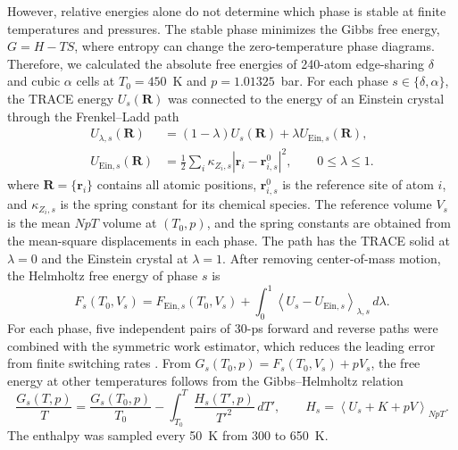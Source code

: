 \documentclass[aps,prx,preprint,notitlepage,superscriptaddress,nofootinbib,floatfix]{revtex4-2}
\newif\ifshowrevisions
\newcommand{\drafttwentysix}[1]{%
  \ifshowrevisions\textcolor{drafttwentysixcolor}{#1}\else#1\fi}
\newcommand{\drafttwentysixeq}[1]{%
  \ifshowrevisions{\color{drafttwentysixcolor}#1}\else#1\fi}
\begin{document}
However, relative energies alone do not determine which phase is stable at finite temperatures and pressures. The stable phase minimizes the Gibbs free energy, $G=H-TS$, where entropy can change the zero-temperature phase diagrams. Therefore, we calculated the absolute free energies of 240-atom edge-sharing $\delta$ and cubic $\alpha$ cells at $T_0=450$~K and $p=1.01325$~bar. For each phase $s\in\{\delta,\alpha\}$, the TRACE energy $U_s(\mathbf R)$ was connected to the energy of an Einstein crystal through the Frenkel--Ladd path
\cite{frenkel1984}
\begin{equation}
\drafttwentysixeq{
\begin{aligned}
 U_{\lambda,s}(\mathbf R)
 &= (1-\lambda)U_s(\mathbf R)
    +\lambda U_{\mathrm{Ein},s}(\mathbf R),\\
 U_{\mathrm{Ein},s}(\mathbf R)
 &= \frac{1}{2}\sum_i \kappa_{Z_i,s}
    \left|\mathbf r_i-\mathbf r^0_{i,s}\right|^2,
 \qquad 0\leq\lambda\leq1 .
\end{aligned}}
\label{eq:cspbi3-frenkel-ladd-path}
\end{equation}
\drafttwentysix{where $\mathbf R=\{\mathbf r_i\}$ contains all atomic
positions, $\mathbf r^0_{i,s}$ is the reference site of atom $i$, and
$\kappa_{Z_i,s}$ is the spring constant for its chemical species. The reference volume $V_s$ is the mean $NpT$ volume at $(T_0,p)$, and the spring constants are obtained from the mean-square displacements in each phase. The path has the TRACE solid at $\lambda=0$ and the Einstein crystal at $\lambda=1$. After removing center-of-mass motion, the Helmholtz free energy of phase $s$ is}
\begin{equation}
\drafttwentysixeq{
 F_s(T_0,V_s)=F_{\mathrm{Ein},s}(T_0,V_s)
 +\int_0^1
 \left\langle U_s-U_{\mathrm{Ein},s}\right\rangle_{\lambda,s}
 \,d\lambda .}
\label{eq:cspbi3-frenkel-ladd-free-energy}
\end{equation}
For each phase, five independent pairs of 30-ps forward and
reverse paths were combined with the symmetric work estimator, which reduces the leading error from finite switching rates \cite{freitas2016}. From $G_s(T_0,p)=F_s(T_0,V_s)+pV_s$, the free energy at other temperatures follows from the Gibbs--Helmholtz relation
\begin{equation}
\drafttwentysixeq{
 \frac{G_s(T,p)}{T}
 =\frac{G_s(T_0,p)}{T_0}
 -\int_{T_0}^{T}\frac{H_s(T',p)}{T'^2}\,dT',
 \qquad
 H_s=\left\langle U_s+K+pV\right\rangle_{NpT}.}
\label{eq:cspbi3-gibbs-helmholtz}
\end{equation}
The enthalpy was sampled every 50~K from 300 to 650~K.
\end{document}
